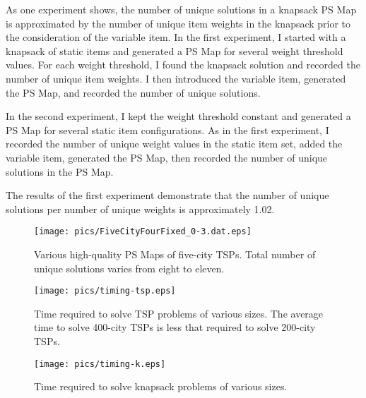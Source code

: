 As one experiment shows, the number of unique solutions in a knapsack PS Map is approximated by the number of unique item weights in the knapsack prior to the consideration of the variable item.  In the first experiment, I started with a knapsack of static items and generated a PS Map for several weight threshold values.  For each weight threshold, I found the knapsack solution and recorded the number of unique item weights.  I then introduced the variable item, generated the PS Map, and recorded the number of unique solutions.

In the second experiment, I kept the weight threshold constant and generated a PS Map for several static item  configurations.  As in the first experiment, I recorded the number of unique weight values in the static item set, added the variable item, generated the PS Map, then recorded the number of unique solutions in the PS Map.

The results of the first experiment demonstrate that the number of unique solutions per number of unique weights is approximately 1.02.




\begin{figure}
\begin{center}
\texttt{[image: pics/FiveCityFourFixed\_0-3.dat.eps]}
\caption{Various high-quality PS Maps of five-city TSPs.  Total number of unique solutions varies from eight to eleven.}
\label{fig:five_city_tsps}
\end{center}
\end{figure}


\begin{figure}
\begin{center}
\texttt{[image: pics/timing-tsp.eps]}
\caption{Time required to solve TSP problems of various sizes.  The average time to solve 400-city TSPs is less that required to solve 200-city TSPs.}
\label{fig:timing-tsp}
\end{center}
\end{figure}

\begin{figure}
\begin{center}
\texttt{[image: pics/timing-k.eps]}
\caption{Time required to solve knapsack problems of various sizes.}
\label{fig:timing-k}
\end{center}
\end{figure}


